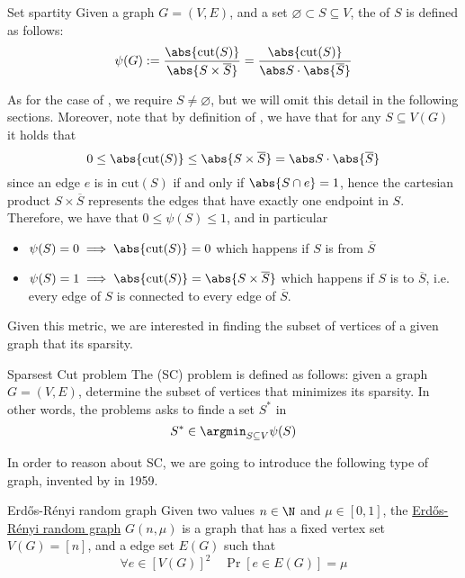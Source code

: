 \documentclass[a4paper, 12pt]{report}
\begin{document}
    \begin{frameddefn}{Set spartity}
        Given a graph $G = (V, E)$, and a set $\varnothing \subset S \subseteq V$, the  of $S$ is defined as follows: $$\psi (G) := \dfrac{\abs{\mathrm{cut}(S)}}{\abs{S \times \overline S}} = \dfrac{\abs{\mathrm{cut}(S)}}{\abs S \cdot \abs{\overline S}}$$
    \end{frameddefn}

    As for the case of , we require $S \neq \varnothing$, but we will omit this detail in the following sections. Moreover, note that by definition of , we have that for any $S \subseteq V(G)$ it holds that $$0 \le \abs{\mathrm{cut}(S)} \le \abs {S \times \overline S} = \abs S \cdot \abs{\overline S}$$ since an edge $e$ is in $\mathrm{cut}(S)$ if and only if $\abs {S \cap e} = 1$, hence the cartesian product $S \times \overline S$ represents the edges that have exactly one endpoint in $S$. Therefore, we have that $0 \le \psi(S) \le 1$, and in particular

    \begin{itemize}
        \item $\psi(S) = 0 \implies \abs{\mathrm{cut}(S)} = 0$ which happens if $S$ is  from $\overline S$
        \item $\psi(S) = 1 \implies \abs{\mathrm{cut}(S)} = \abs{S \times \overline S}$ which happens if $S$ is  to $\overline S$, i.e. every edge of $S$ is connected to every edge of $\overline S$.
    \end{itemize}

    Given this metric, we are interested in finding the subset of vertices of a given graph that  its sparsity.

    \begin{frameddefn}{Sparsest Cut problem}
        The  (SC) problem is defined as follows: given a graph $G = (V, E)$, determine the subset of vertices that minimizes its sparsity. In other words, the problems asks to finde a set $S^*$ in $$S^* \in \argmin_{S \subseteq V}{\psi(S)}$$
    \end{frameddefn}

    In order to reason about SC, we are going to introduce the following type of graph, invented by \textcite{erdos} in 1959.

    \begin{frameddefn}{Erdős-Rényi random graph}
        Given two values $n \in \N$ and $\mu \in [0, 1]$, the \href{https://en.wikipedia.org/wiki/Erd%C5%91s%E2%80%93R%C3%A9nyi_model}{Erdős-Rényi random graph} $G(n, \mu)$ is a graph that has a fixed vertex set $V(G) = [n]$, and a \tit{probabilistic} edge set $E(G)$ such that $$\forall e \in [V(G)]^2 \quad \Pr[e \in E(G)] = \mu$$
    \end{frameddefn}
\end{document}
